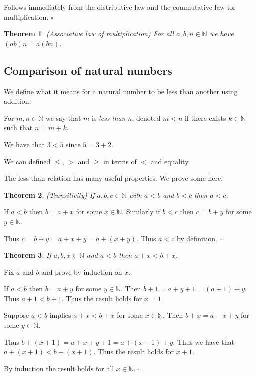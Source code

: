\documentclass[10pt]{article}
\newcommand{\N}{\mathbb{N}}
\newcommand{\qed}{\square}
\newtheorem{theorem}{Theorem}[section]
\newenvironment{proof}[1][Proof]{\begin{trivlist}
\item[\hskip \labelsep {\bfseries #1}]}{\end{trivlist}}
\newenvironment{definition}[1][Definition]{\begin{trivlist}
\item[\hskip \labelsep {\bfseries #1}]}{\end{trivlist}}
\newenvironment{example}[1][Example]{\begin{trivlist}
\item[\hskip \labelsep {\bfseries #1}]}{\end{trivlist}}
\begin{document}
\begin{proof}
Follows immediately from the distributive law and the commutative law for multiplication. $\qed$
\end{proof}

\begin{theorem} (Associative law of multiplication)
For all $a, b, n \in \N$ we have $(ab)n = a(bn)$.
\end{theorem}

\subsection{Comparison of natural numbers}

We define what it means for a natural number to be less than another using addition.

\begin{definition}
For $m, n \in \N$ we say that $m$ is \emph{less than} $n$, denoted $m < n$ if there exists $k \in \N$ such that $n = m + k$.
\end{definition}

\begin{example}
We have that $3 < 5$ since $5 = 3 + 2$.
\end{example}

We can defined $\leq$, $>$ and $\geq$ in terms of $<$ and equality.

The less-than relation has many useful properties. We prove some here.

\begin{theorem} (Transitivity)
If $a, b, c \in \N$ with $a < b$ and $b < c$ then $a < c$.
\end{theorem}

\begin{proof}
If $a < b$ then $b = a + x$ for some $x \in \N$. Similarly if $b < c$ then $c = b + y$ for some $y \in \N$.

Thus $c = b + y = a + x + y = a + (x + y)$. Thus $a < c$ by definition. $\qed$
\end{proof}

\begin{theorem}
If $a, b, x \in \N$ and $a < b$ then $a + x < b + x$.
\end{theorem}

\begin{proof}
Fix $a$ and $b$ and prove by induction on $x$.

If $a < b$ then $b = a + y$ for some $y \in \N$. Then $b + 1 = a + y + 1 = (a + 1) + y$. Thus $a + 1 < b + 1$. Thus the result holds for $x = 1$.

Suppose $a < b$ implies $a + x < b + x$ for some $x \in \N$. Then $b + x = a + x + y$ for some $y \in \N$.

Thus $b + (x + 1) = a + x + y + 1 = a + (x + 1) + y$. Thus we have that $a + (x + 1) < b + (x + 1)$. Thus the result holds for $x + 1$. 

By induction the result holds for all $x \in \N$. $\qed$
\end{proof}
\end{document}
